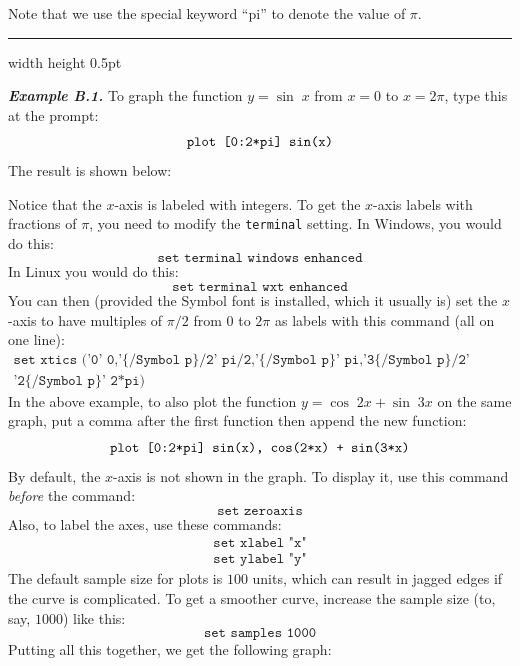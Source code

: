 Note that we use the special keyword ``pi'' to denote the value of $\pi$.

\vspace{2mm}
\hrule width \textwidth height 0.5pt\vspace{2mm}
\par\noindent \emph{\textbf{Example B.1.}}
 To graph the function $y=\sin\;x$ from $x=0$ to $x=2\pi$, type this at the
 \textbf{} prompt:
 \begin{displaymath}
  \texttt{plot \symbol{91}0:2*pi\symbol{93} sin(x)}
 \end{displaymath}
 The result is shown below:
 
\begin{figure}[h]
 \begin{center}
  
 \end{center}
\end{figure}

Notice that the $x$-axis is labeled with integers. To get the $x$-axis labels with fractions of
$\pi$, you need to modify the \texttt{terminal} setting. In Windows, you would do this:
\begin{displaymath}
 \texttt{set terminal windows enhanced}
\end{displaymath}
In Linux you would do this:
\begin{displaymath}
 \texttt{set terminal wxt enhanced}
\end{displaymath}
You can then (provided the Symbol font is installed, which it usually is) set the $x$-axis to have
multiples of $\pi/2$ from $0$ to $2\pi$ as labels with this command (all on one line):
\begin{gather*}
 \texttt{set xtics ('0' 0,'\{/Symbol p\}/2' pi/2,'\{/Symbol p\}' pi,'3\{/Symbol p\}/2' 3*pi/2,}\\
 \texttt{'2\{/Symbol p\}' 2*pi)}
\end{gather*}
In the above example,
 to also plot the function $y=\cos\;2x + \sin\;3x$ on the same graph, put a comma after the first
 function then append the new function:
 \begin{displaymath}
  \texttt{plot \symbol{91}0:2*pi\symbol{93} sin(x), cos(2*x) + sin(3*x)}
 \end{displaymath}
By default, the $x$-axis is not shown in the graph. To display it, use this command
\emph{before} the \textbf{} command:
\begin{displaymath}
 \texttt{set zeroaxis}
\end{displaymath}
Also, to label the axes, use these commands:
\begin{gather*}
 \texttt{set xlabel "x"}\\\texttt{set ylabel "y"}
\end{gather*}
The default sample size for plots is $100$ units, which can result in jagged edges if the curve
is complicated. To get a smoother curve, increase the
sample size (to, say, $1000$) like this:
\begin{displaymath}
 \texttt{set samples 1000}
\end{displaymath}
Putting all this together, we get the following graph:

